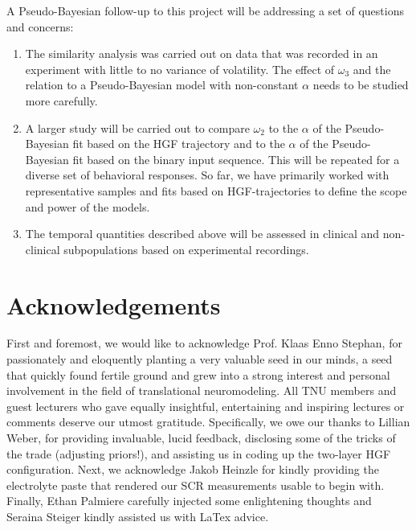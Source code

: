 \documentclass{article}
\begin{document}
\begin{multicols}{2}
A Pseudo-Bayesian follow-up to this project will be addressing a set of questions and concerns: 

\begin{enumerate}
\item The similarity analysis was carried out on data that was recorded in an experiment with little to no variance of volatility. The effect of $\omega_3$ and the relation to a Pseudo-Bayesian model with non-constant $\alpha$ needs to be studied more carefully. 
\item A larger study will be carried out to compare $\omega_2$ to the $\alpha$ of the Pseudo-Bayesian fit based on the HGF trajectory and to the $\alpha$ of the Pseudo-Bayesian fit based on the binary input sequence. This will be repeated for a diverse set of behavioral responses. So far, we have primarily worked with representative samples and fits based on HGF-trajectories to define the scope and power of the models.  
\item The temporal quantities described above will be assessed in clinical and non-clinical subpopulations based on experimental recordings. 
\end{enumerate}

\section*{Acknowledgements}

First and foremost, we would like to acknowledge Prof. Klaas Enno Stephan, for passionately and eloquently planting a very valuable seed in our minds, a seed that quickly found fertile ground and grew into a strong interest and personal involvement in the field of translational neuromodeling. All TNU members and guest lecturers who gave equally insightful, entertaining and inspiring lectures or comments deserve our utmost gratitude.
Specifically, we owe our thanks to Lillian Weber, for providing invaluable, lucid feedback, disclosing some of the tricks of the trade (adjusting priors!), and assisting us in coding up the two-layer HGF configuration. Next, we acknowledge Jakob Heinzle for kindly providing the electrolyte paste that rendered our SCR measurements usable to begin with. Finally, Ethan Palmiere carefully injected some enlightening thoughts and Seraina Steiger kindly assisted us with LaTex advice. %



\newpage



\end{multicols}
\end{document}
